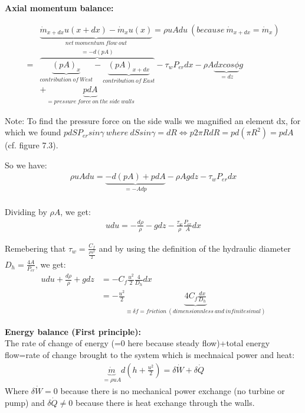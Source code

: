 \textbf{Axial momentum balance:} 

\begin{equation}
\begin{aligned}
&\underbrace{\dot{m}_{x+dx}u(x+dx)-\dot{m}_{x}u(x)}_{net\ momentum\ flow\ out}=\rho u Adu\ (because\ \dot{m}_{x+dx}=\dot{m}_{x})\\
=&\overbrace{\underbrace{(pA)_x}_{contribution\ of\ West}-\underbrace{(pA)_{x+dx}}_{contribution\ of\ East}}^{=-d(pA)} -\tau_w P_{er} dx -\rho A \underbrace{dx cos\phi}_{=dz} g\\
&+\underbrace{pdA}_{=pressure\ force\ on\ the\ side\ walls}
\end{aligned}
\end{equation}

Note: To find the pressure force on the side walls we magnified an element dx, for which we found $pdSP_{er}sin \gamma \ where\  dS sin \gamma=dR \Leftrightarrow p2 \pi RdR=pd(\pi R^2)=pdA$ (cf. figure 7.3).

So we have:
\begin{equation}
\begin{aligned}
\rho u Adu=\underbrace{-d(pA)+pdA}_{=-Adp}-\rho Agdz- \tau_w P_{er} dx \\
\end{aligned}
\end{equation}

Dividing by $\rho A$, we get:
\begin{equation}
\begin{aligned}
udu=-\frac{d\rho}{\rho}-gdz-\frac{\tau_w}{\rho} \frac{P_{er}}{A}dx
\end{aligned}
\end{equation}

Remebering that $\tau_w=\frac{C_f}{\frac{\rho u^2}{2}}$ and by using the definition of the hydraulic diameter $D_h=\frac{4A}{P_{er}}$, we get:
\begin{equation}
\begin{aligned}
udu+\frac{d\rho}{\rho}+gdz&=-C_f \frac{u^2}{2} \frac{4}{D_h}dx
\\
&= -\frac{u^2}{2} \underbrace{4C_f  \frac{dx}{D_h}}_{\equiv \delta f=friction\ (dimensionnless\ and\ infinitesimal)}
\end{aligned} 
\end{equation}

\textbf{Energy balance (First principle):}
\\

The rate of change of energy (=0 here because steady flow)+total energy flow=rate of change brought to the system which is mechnaical power and heat:
\begin{equation}
\begin{aligned}
\underbrace{\dot{m}}_{=\rho u A} d(h+\frac{u^2}{2})=\delta \dot{W} +\delta \dot{Q}
\end{aligned} 
\end{equation}
Where $\delta \dot{W}=0$ because there is no mechanical power exchange (no turbine or pump) and $\delta \dot{Q} \neq 0$ because there is heat exchange through the walls.
\\

